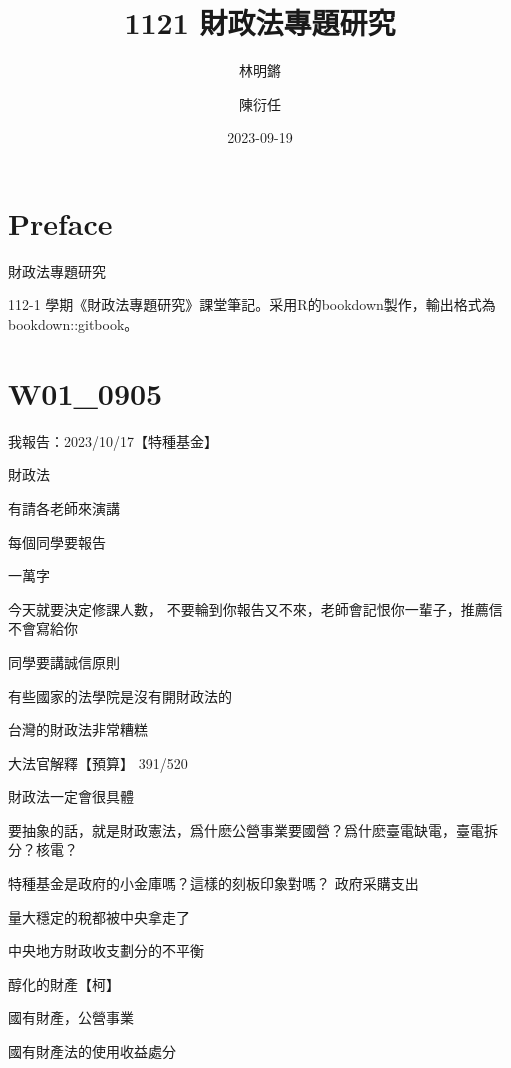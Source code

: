 \documentclass[]{book}
\title{1121 財政法專題研究}
\author{林明鏘 \and 陳衍任}
\date{2023-09-19}
\begin{document}
\maketitle


\thispagestyle{empty}

\begin{center}

    
\end{center}

\setlength{\abovedisplayskip}{-5pt}
\setlength{\abovedisplayshortskip}{-5pt}

{
\setcounter{tocdepth}{2}
\tableofcontents
}
\hypertarget{preface}{%
\chapter*{Preface}\label{preface}}


財政法專題研究

112-1 學期《財政法專題研究》課堂筆記。采用R的bookdown製作，輸出格式為bookdown::gitbook。

\hypertarget{ux7b2cux4e00ux5468}{%
\chapter{W01\_0905}\label{ux7b2cux4e00ux5468}}

我報告：2023/10/17【特種基金】

財政法

有請各老師來演講

每個同學要報告

一萬字

今天就要決定修課人數，
不要輪到你報告又不來，老師會記恨你一輩子，推薦信不會寫給你

同學要講誠信原則

有些國家的法學院是沒有開財政法的

台灣的財政法非常糟糕

大法官解釋【預算】
391/520

財政法一定會很具體

要抽象的話，就是財政憲法，爲什麽公營事業要國營？爲什麽臺電缺電，臺電拆分？核電？

特種基金是政府的小金庫嗎？這樣的刻板印象對嗎？
政府采購支出

量大穩定的稅都被中央拿走了

中央地方財政收支劃分的不平衡

醇化的財產【柯】

國有財產，公營事業

國有財產法的使用收益處分
\end{document}
